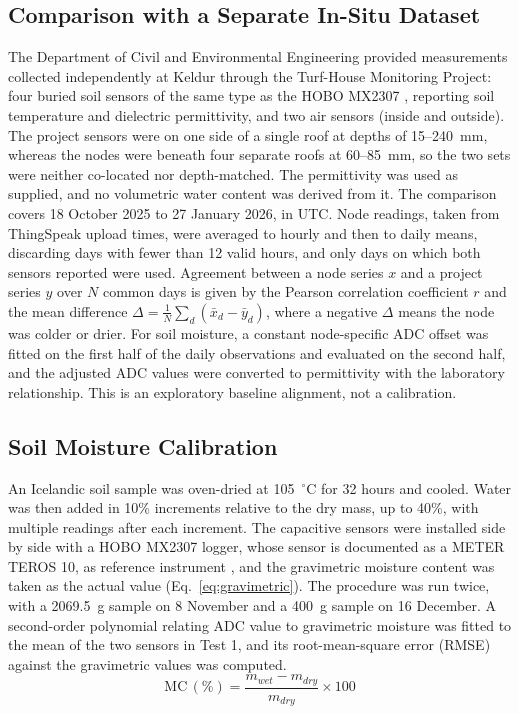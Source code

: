 \subsection{Comparison with a Separate In-Situ Dataset}
The Department of Civil and Environmental Engineering provided measurements collected independently at Keldur through the Turf-House Monitoring Project: four buried soil sensors of the same type as the HOBO MX2307 \cite{onset_mx2307}, reporting soil temperature and dielectric permittivity, and two air sensors (inside and outside). The project sensors were on one side of a single roof at depths of 15--240~mm, whereas the nodes were beneath four separate roofs at 60--85~mm, so the two sets were neither co-located nor depth-matched. The permittivity was used as supplied, and no volumetric water content was derived from it. The comparison covers 18 October 2025 to 27 January 2026, in UTC. Node readings, taken from ThingSpeak upload times, were averaged to hourly and then to daily means, discarding days with fewer than 12 valid hours, and only days on which both sensors reported were used. Agreement between a node series $x$ and a project series $y$ over $N$ common days is given by the Pearson correlation coefficient $r$ and the mean difference $\Delta=\frac{1}{N}\sum_d(\bar{x}_d-\bar{y}_d)$, where a negative $\Delta$ means the node was colder or drier. For soil moisture, a constant node-specific ADC offset was fitted on the first half of the daily observations and evaluated on the second half, and the adjusted ADC values were converted to permittivity with the laboratory relationship. This is an exploratory baseline alignment, not a calibration.

\subsection{Soil Moisture Calibration}
An Icelandic soil sample was oven-dried at 105~$^\circ$C for 32 hours and cooled. Water was then added in 10\% increments relative to the dry mass, up to 40\%, with multiple readings after each increment. The capacitive sensors were installed side by side with a HOBO MX2307 logger, whose sensor is documented as a METER TEROS 10, as reference instrument \cite{onset_mx2307}, and the gravimetric moisture content was taken as the actual value (Eq.~\ref{eq:gravimetric}). The procedure was run twice, with a 2069.5~g sample on 8 November and a 400~g sample on 16 December. A second-order polynomial relating ADC value to gravimetric moisture was fitted to the mean of the two sensors in Test 1, and its root-mean-square error (RMSE) against the gravimetric values was computed.
\begin{equation}
\text{MC}\,(\%) = \frac{m_{wet}-m_{dry}}{m_{dry}}\times 100
\label{eq:gravimetric}
\end{equation}
